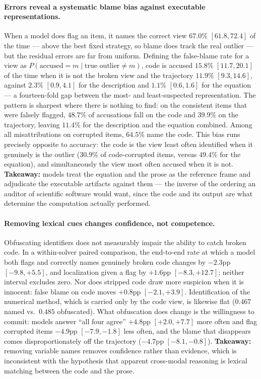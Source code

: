 \paragraph{Errors reveal a systematic blame bias against executable representations.}
When a model does flag an item, it names the correct view $67.0\%$ $[61.8, 72.4]$ of
the time --- above the best fixed strategy, so blame does track the real outlier ---
but the residual errors are far from uniform. Defining the false-blame rate for a
view as $P(\text{accused} = m \mid \text{true outlier} \neq m)$, code is accused
$15.8\%$ $[11.7, 20.1]$ of the time when it is not the broken view and the
trajectory $11.9\%$ $[9.3, 14.6]$, against $2.3\%$ $[0.9, 4.1]$ for the description
and $1.1\%$ $[0.6, 1.6]$ for the equation --- a fourteen-fold gap between the most-
and least-suspected representation. The pattern is sharpest where there is nothing
to find: on the consistent items that were falsely flagged, $48.7\%$ of accusations
fall on the code and $39.9\%$ on the trajectory, leaving $11.4\%$ for the
description and the equation combined. Among all misattributions on corrupted items,
$64.5\%$ name the code. This bias runs precisely opposite to accuracy: the code is
the view least often identified when it genuinely is the outlier ($30.9\%$ of
code-corrupted items, versus $49.4\%$ for the equation), and simultaneously the view
most often accused when it is not. \textbf{Takeaway:} models treat the equation and
the prose as the reference frame and adjudicate the executable artifacts against
them --- the inverse of the ordering an auditor of scientific software would want,
since the code and its output are what determine the computation actually performed.

\paragraph{Removing lexical cues changes confidence, not competence.}
Obfuscating identifiers does not measurably impair the ability to catch broken code.
In a within-solver paired comparison, the end-to-end rate at which a model both
flags and correctly names genuinely broken code changes by $-2.3$pp $[-9.8, +5.5]$,
and localization given a flag by $+1.6$pp $[-8.3, +12.7]$; neither interval excludes
zero. Nor does stripped code draw more suspicion when it is innocent: false blame on
code moves $+0.8$pp $[-2.1, +3.9]$. Identification of the numerical method, which is
carried only by the code view, is likewise flat ($0.467$ named vs.\ $0.485$
obfuscated). What obfuscation does change is the willingness to commit: models
answer ``all four agree'' $+4.8$pp $[+2.0, +7.7]$ more often and flag corrupted
items $-4.9$pp $[-7.9, -1.8]$ less often, and the blame that disappears comes
disproportionately off the trajectory ($-4.7$pp $[-8.1, -0.8]$).
\textbf{Takeaway:} removing variable names removes confidence rather than evidence,
which is inconsistent with the hypothesis that apparent cross-modal reasoning is
lexical matching between the code and the prose.

